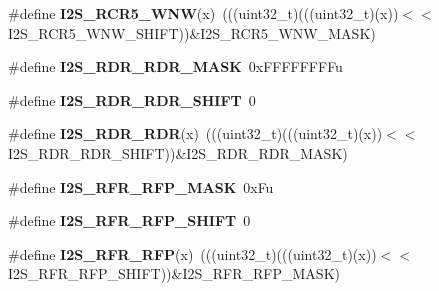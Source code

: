 \begin{DoxyCompactItemize}
\item 
\#define {\bfseries I2\+S\+\_\+\+R\+C\+R5\+\_\+\+W\+NW}(x)~(((uint32\+\_\+t)(((uint32\+\_\+t)(x))$<$$<$I2\+S\+\_\+\+R\+C\+R5\+\_\+\+W\+N\+W\+\_\+\+S\+H\+I\+FT))\&I2\+S\+\_\+\+R\+C\+R5\+\_\+\+W\+N\+W\+\_\+\+M\+A\+SK)\hypertarget{group__I2S__Register__Masks_ga2fe4fc2933c0338095194c6c09bb0512}{}\label{group__I2S__Register__Masks_ga2fe4fc2933c0338095194c6c09bb0512}

\item 
\#define {\bfseries I2\+S\+\_\+\+R\+D\+R\+\_\+\+R\+D\+R\+\_\+\+M\+A\+SK}~0x\+F\+F\+F\+F\+F\+F\+F\+Fu\hypertarget{group__I2S__Register__Masks_gaccf614975eae2e2df22dafe25a0f15e5}{}\label{group__I2S__Register__Masks_gaccf614975eae2e2df22dafe25a0f15e5}

\item 
\#define {\bfseries I2\+S\+\_\+\+R\+D\+R\+\_\+\+R\+D\+R\+\_\+\+S\+H\+I\+FT}~0\hypertarget{group__I2S__Register__Masks_ga044f3938825909104af369aa0c62f2f5}{}\label{group__I2S__Register__Masks_ga044f3938825909104af369aa0c62f2f5}

\item 
\#define {\bfseries I2\+S\+\_\+\+R\+D\+R\+\_\+\+R\+DR}(x)~(((uint32\+\_\+t)(((uint32\+\_\+t)(x))$<$$<$I2\+S\+\_\+\+R\+D\+R\+\_\+\+R\+D\+R\+\_\+\+S\+H\+I\+FT))\&I2\+S\+\_\+\+R\+D\+R\+\_\+\+R\+D\+R\+\_\+\+M\+A\+SK)\hypertarget{group__I2S__Register__Masks_ga116e8038e227181784edc27efd68458d}{}\label{group__I2S__Register__Masks_ga116e8038e227181784edc27efd68458d}

\item 
\#define {\bfseries I2\+S\+\_\+\+R\+F\+R\+\_\+\+R\+F\+P\+\_\+\+M\+A\+SK}~0x\+Fu\hypertarget{group__I2S__Register__Masks_ga47151099035d8d850a3fb194cdb35bb2}{}\label{group__I2S__Register__Masks_ga47151099035d8d850a3fb194cdb35bb2}

\item 
\#define {\bfseries I2\+S\+\_\+\+R\+F\+R\+\_\+\+R\+F\+P\+\_\+\+S\+H\+I\+FT}~0\hypertarget{group__I2S__Register__Masks_ga7ffec4d33d58891c8388e1e85b206f58}{}\label{group__I2S__Register__Masks_ga7ffec4d33d58891c8388e1e85b206f58}

\item 
\#define {\bfseries I2\+S\+\_\+\+R\+F\+R\+\_\+\+R\+FP}(x)~(((uint32\+\_\+t)(((uint32\+\_\+t)(x))$<$$<$I2\+S\+\_\+\+R\+F\+R\+\_\+\+R\+F\+P\+\_\+\+S\+H\+I\+FT))\&I2\+S\+\_\+\+R\+F\+R\+\_\+\+R\+F\+P\+\_\+\+M\+A\+SK)\hypertarget{group__I2S__Register__Masks_ga48f5461338aaab9b151fa6e7272f3cdb}{}\label{group__I2S__Register__Masks_ga48f5461338aaab9b151fa6e7272f3cdb}


\end{DoxyCompactItemize}
